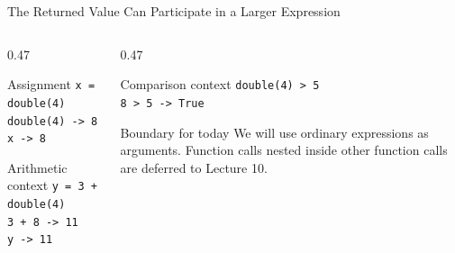 \documentclass[aspectratio=169,10pt]{beamer}
\begin{document}
\begin{frame}{The Returned Value Can Participate in a Larger Expression}
  \begin{columns}[T,onlytextwidth]
    \begin{column}{0.47\textwidth}
      \begin{block}{Assignment}
        \texttt{x = double(4)}\\[0.06in]
        \texttt{double(4) -> 8}\\
        \texttt{x -> 8}
      \end{block}

      \begin{block}{Arithmetic context}
        \texttt{y = 3 + double(4)}\\[0.06in]
        \texttt{3 + 8 -> 11}\\
        \texttt{y -> 11}
      \end{block}
    \end{column}

    \begin{column}{0.47\textwidth}
      \begin{block}{Comparison context}
        \texttt{double(4) > 5}\\[0.06in]
        \texttt{8 > 5 -> True}
      \end{block}

      \begin{alertblock}{Boundary for today}
        We will use ordinary expressions as arguments. Function calls nested inside other function calls are deferred to Lecture 10.
      \end{alertblock}
    \end{column}
  \end{columns}
\end{frame}

\end{document}
